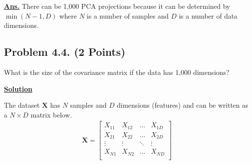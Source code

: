\documentclass[12pt, a4paper]{article}
\begin{document}
            \vspace{1em}

            \noindent \underline{\textbf{Ans.}} There can be 1,000 PCA projections because
            it can be determined by $\min(N - 1, D)$ where $N$ is a number of samples and $D$ is a number of data dimensions.

    \pagebreak

        \subsection{Problem 4.4. (2 Points)}
            What is the size of the covariance matrix if the data has 1,000 dimensions?

            \vspace{1em}

            \noindent \underline{\textbf{Solution}}

            \vspace{0.25em}

            The dataset $\mathbf{X}$ has $N$ samples and $D$ dimensions (features) and can be written as a $N \times D$ matrix below.
            \begin{align*}
                \mathbf{X} =
                \begin{bmatrix}
                    X_{11} & X_{12} & \dots & X_{1D} \\
                    X_{21} & X_{22} & \dots & X_{2D} \\
                    \vdots & \vdots & \ddots & \vdots \\
                    X_{N1} & X_{N2} & \dots & X_{ND} \\
                \end{bmatrix}
            \end{align*}
\end{document}
